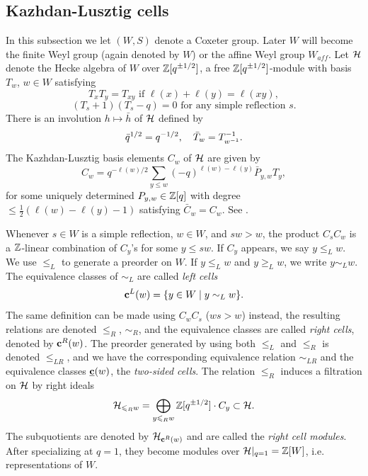 \documentclass[reqno]{amsart}
\newcommand{\ubar}[1]{\underline{#1}}
\begin{document}
\subsection{Kazhdan-Lusztig cells}\label{subsec:KL-cells}


In this subsection we let $(W,S)$ denote a Coxeter group. Later $W$ will become the finite Weyl group (again denoted by $W$) or the affine Weyl group $W_{aff}$. Let $\mathcal{H}$ denote the Hecke algebra of $W$ over $\mathbb{Z}[q^{\pm1/2}]$, a free $\mathbb{Z}[q^{\pm1/2}]$-module with basis $T_w$, $w \in W$ satisfying
\begin{equation*}
	T_x T_y = T_{xy} \text{ if } \ell(x) + \ell(y) = \ell(xy),
\end{equation*}
\begin{equation*}
	(T_s + 1)(T_s - q) = 0 \text{ for any simple reflection } s.
\end{equation*}
There is an involution $h \mapsto \bar h$ of $\mathcal{H}$ defined by
\begin{equation*}
	\bar q^{1/2} = q^{-1/2}, \quad \bar T_w = T_{w^{-1}}^{-1}.
\end{equation*}
The Kazhdan-Lusztig basis elements $C_w$ of $\mathcal{H}$ are given by
\begin{equation*}
	C_w = q^{-\ell(w)/2} \sum_{y \le w} (-q)^{\ell(w) - \ell(y)} \bar P_{y,w} T_y,
\end{equation*}
for some uniquely determined $P_{y,w} \in \mathbb{Z}[q]$ with degree $\le \frac12 (\ell(w) - \ell(y) - 1)$ satisfying $\bar C_w = C_w$. See \cite[Theorem 1.1]{KL:Hecke}. 

Whenever $s \in W$ is a simple reflection, $w \in W$, and $sw > w$, the product $C_s C_w$ is a $\mathbb{Z}$-linear combination of $C_y$'s for some $y \le sw$. If $C_y$ appears, we say $y \le_L w$. We use $\le_L$ to generate a preorder on $W$. If $y \le_L w$ and $y \ge_L w$, we write $y \sim_L w$. The equivalence classes of $\sim_L$ are called \textit{left cells}
\begin{equation*}
	\mathbf{c}^L(w) = \{ y \in W \mid y \sim_L w\}.
\end{equation*}
The same definition can be made using $C_w C_s$ ($ws > w$) instead, the resulting relations are denoted $\le_R$, $\sim_R$, and the equivalence classes are called \textit{right cells}, denoted by $\mathbf{c}^R(w)$. The preorder generated by using both $\le_L$ and $\le_R$ is denoted $\le_{LR}$, and we have the corresponding equivalence relation $\sim_{LR}$ and the equivalence classes $\ubar \bc(w)$, the \textit{two-sided cells}. The relation $\le_R$ induces a filtration on $\mathcal{H}$ by right ideals
\begin{equation*}
	\mathcal{H}_{\leqslant_R w} = \bigoplus_{y \leqslant_R w} \mathbb{Z}[q^{\pm1/2}] \cdot C_y \subset \mathcal{H}.
\end{equation*}
The subquotients are denoted by $\mathcal{H}_{\mathbf{c}^R(w)}$ and are called the \textit{right cell modules}. After specializing at $q=1$, they become modules over $\mathcal{H}|_{q=1} = \mathbb{Z}[W]$, i.e. representations of $W$.
\end{document}
